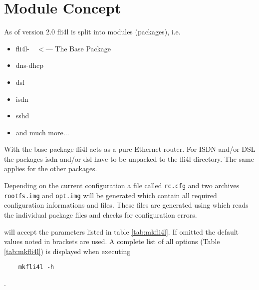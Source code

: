 
\section{Module Concept}

As of version 2.0 fli4l is split into modules (packages), i.e.

\begin{itemize}
    \item fli4l-\version~~$<$--- The Base Package
    \item dns-dhcp
    \item dsl
    \item isdn
    \item sshd
\item and much more...
\end{itemize}


With the base package fli4l acts as a pure Ethernet router. For ISDN
and/or DSL the packages isdn and/or dsl have to be unpacked to the
fli4l directory. The same applies for the other packages.



Depending on the current configuration a file called \texttt{rc.cfg} and two
archives \texttt{rootfs.img} and \texttt{opt.img} will be generated
which contain all required configuration informations and files.
These files are generated using  which reads the individual
package files and checks for configuration errors.

 will accept the parameters listed in table \ref{tab:mkfli4l}.
If omitted the default values noted in brackets are used. A complete list
of all options (Table \ref{tab:mkfli4l}) is displayed when executing
\begin{verbatim}
    mkfli4l -h
\end{verbatim}
.

